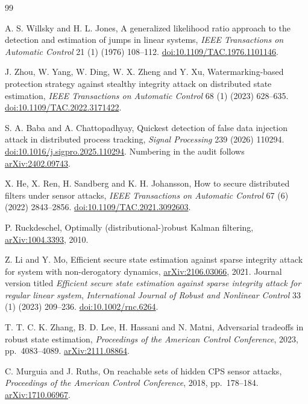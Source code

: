 \begin{thebibliography}{99}
\raggedright

A. S. Willsky and H. L. Jones,
A generalized likelihood ratio approach to the detection and estimation of jumps in linear systems,
\emph{IEEE Transactions on Automatic Control} 21 (1) (1976) 108--112.
\href{https://doi.org/10.1109/TAC.1976.1101146}{doi:10.1109/TAC.1976.1101146}.

J. Zhou, W. Yang, W. Ding, W. X. Zheng and Y. Xu,
Watermarking-based protection strategy against stealthy integrity attack on distributed state estimation,
\emph{IEEE Transactions on Automatic Control} 68 (1) (2023) 628--635.
\href{https://doi.org/10.1109/TAC.2022.3171422}{doi:10.1109/TAC.2022.3171422}.

S. A. Baba and A. Chattopadhyay,
Quickest detection of false data injection attack in distributed process tracking,
\emph{Signal Processing} 239 (2026) 110294.
\href{https://doi.org/10.1016/j.sigpro.2025.110294}{doi:10.1016/j.sigpro.2025.110294}.
Numbering in the audit follows \href{https://arxiv.org/abs/2402.09743}{arXiv:2402.09743}.

X. He, X. Ren, H. Sandberg and K. H. Johansson,
How to secure distributed filters under sensor attacks,
\emph{IEEE Transactions on Automatic Control} 67 (6) (2022) 2843--2856.
\href{https://doi.org/10.1109/TAC.2021.3092603}{doi:10.1109/TAC.2021.3092603}.

P. Ruckdeschel,
Optimally (distributional-)robust Kalman filtering,
\href{https://arxiv.org/abs/1004.3393}{arXiv:1004.3393}, 2010.

Z. Li and Y. Mo,
Efficient secure state estimation against sparse integrity attack for system with non-derogatory dynamics,
\href{https://arxiv.org/abs/2106.03066}{arXiv:2106.03066}, 2021.
Journal version titled \emph{Efficient secure state estimation against sparse integrity attack for regular linear system},
\emph{International Journal of Robust and Nonlinear Control} 33 (1) (2023) 209--236.
\href{https://doi.org/10.1002/rnc.6264}{doi:10.1002/rnc.6264}.

T. T. C. K. Zhang, B. D. Lee, H. Hassani and N. Matni,
Adversarial tradeoffs in robust state estimation,
\emph{Proceedings of the American Control Conference}, 2023, pp.\ 4083--4089.
\href{https://arxiv.org/abs/2111.08864}{arXiv:2111.08864}.

C. Murguia and J. Ruths,
On reachable sets of hidden CPS sensor attacks,
\emph{Proceedings of the American Control Conference}, 2018, pp.\ 178--184.
\href{https://arxiv.org/abs/1710.06967}{arXiv:1710.06967}.


\end{thebibliography}
